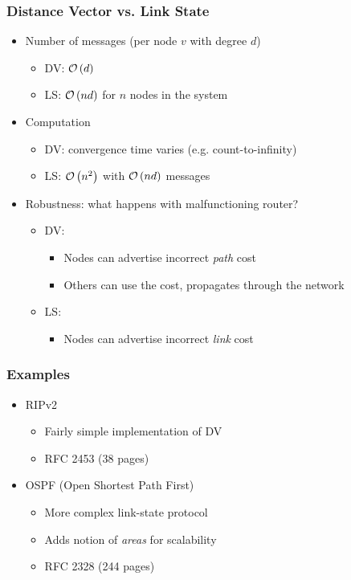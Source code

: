 \subsubsection{Distance Vector vs. Link State}
\begin{itemize}[nosep]
    \item Number of messages (per node $v$ with degree $d$)
          \begin{itemize}[nosep]
              \item DV: $\mathcal{O}\left(d\right)$
              \item LS: $\mathcal{O}\left(nd\right)$ for $n$ nodes in the system
          \end{itemize}
    \item Computation
          \begin{itemize}[nosep]
              \item DV: convergence time varies (e.g. count-to-infinity)
              \item LS: $\mathcal{O}\left(n^2\right)$ with $\mathcal{O}\left(nd\right)$ messages
          \end{itemize}
    \item Robustness: what happens with malfunctioning router?
          \begin{itemize}[nosep]
              \item DV:
                    \begin{itemize}[nosep]
                        \item Nodes can advertise incorrect \emph{path} cost
                        \item Others can use the cost, propagates through the network
                    \end{itemize}
              \item LS:
                    \begin{itemize}[nosep]
                        \item Nodes can advertise incorrect \emph{link} cost
                    \end{itemize}
          \end{itemize}
\end{itemize}
\subsubsection{Examples}
\begin{itemize}[nosep]
    \item RIPv2
          \begin{itemize}[nosep]
              \item Fairly simple implementation of DV
              \item RFC 2453 (38 pages)
          \end{itemize}
    \item OSPF (Open Shortest Path First)
          \begin{itemize}[nosep]
              \item More complex link-state protocol
              \item Adds notion of \emph{areas} for scalability
              \item RFC 2328 (244 pages)
          \end{itemize}
\end{itemize}
